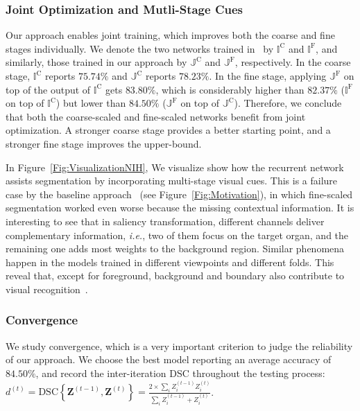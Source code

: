 \documentclass[10pt,twocolumn,letterpaper]{article}
\begin{document}
\subsubsection{Joint Optimization and Mutli-Stage Cues}
\label{ExperimentsNIH:Diagnosis:JointOptimization}

Our approach enables joint training, which improves both the coarse and fine stages individually.
We denote the two networks trained in~\cite{Zhou_2017_Fixed} by $\mathbb{I}^\mathrm{C}$ and $\mathbb{I}^\mathrm{F}$,
and similarly, those trained in our approach by $\mathbb{J}^\mathrm{C}$ and $\mathbb{J}^\mathrm{F}$, respectively.
In the coarse stage, $\mathbb{I}^\mathrm{C}$ reports $75.74\%$ and $\mathbb{J}^\mathrm{C}$ reports $78.23\%$.
In the fine stage, applying $\mathbb{J}^\mathrm{F}$ on top of the output of $\mathbb{I}^\mathrm{C}$ gets $83.80\%$,
which is considerably higher than $82.37\%$ ($\mathbb{I}^\mathrm{F}$ on top of $\mathbb{I}^\mathrm{C}$)
but lower than $84.50\%$ ($\mathbb{J}^\mathrm{F}$ on top of $\mathbb{J}^\mathrm{C}$).
Therefore, we conclude that both the coarse-scaled and fine-scaled networks benefit from joint optimization.
A stronger coarse stage provides a better starting point, and a stronger fine stage improves the upper-bound.

In Figure~\ref{Fig:VisualizationNIH},
We visualize show how the recurrent network assists segmentation by incorporating multi-stage visual cues.
This is a failure case by the baseline approach~\cite{Zhou_2017_Fixed} (see Figure~\ref{Fig:Motivation}),
in which fine-scaled segmentation worked even worse because the missing contextual information.
It is interesting to see that in saliency transformation, different channels deliver complementary information,
{\em i.e.}, two of them focus on the target organ, and the remaining one adds most weights to the background region.
Similar phenomena happen in the models trained in different viewpoints and different folds.
This reveal that, except for foreground, background and boundary also contribute to visual recognition~\cite{Zhu_2017_Object}.


\vspace{-0.2cm}
\subsubsection{Convergence}
\label{ExperimentsNIH:Diagnosis:Convergence}

We study convergence, which is a very important criterion to judge the reliability of our approach.
We choose the best model reporting an average accuracy of $84.50\%$,
and record the inter-iteration DSC throughout the testing process: ${d^{\left(t\right)}}=
    {\mathrm{DSC}\!\left\{\mathbf{Z}^{\left(t-1\right)},\mathbf{Z}^{\left(t\right)}\right\}}=
    {\frac{2\times{\sum_i}Z_i^{\left(t-1\right)}Z_i^{\left(t\right)}}
    {{\sum_i}Z_i^{\left(t-1\right)}+Z_i^{\left(t\right)}}}$.
\end{document}
